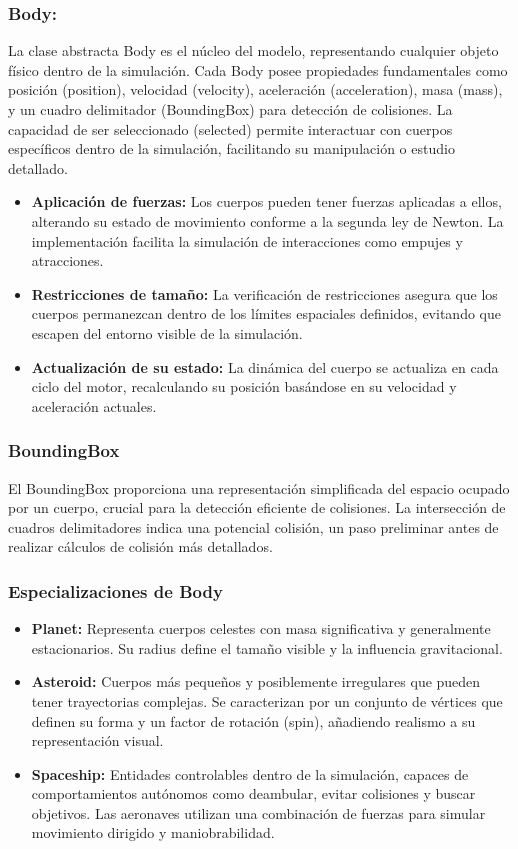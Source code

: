 \subsubsection{\textbf{Body:}}
La clase abstracta Body es el núcleo del modelo, representando cualquier objeto físico dentro de la simulación. Cada Body posee propiedades fundamentales como posición (position), velocidad (velocity), aceleración (acceleration), masa (mass), y un cuadro delimitador (BoundingBox) para detección de colisiones. La capacidad de ser seleccionado (selected) permite interactuar con cuerpos específicos dentro de la simulación, facilitando su manipulación o estudio detallado.
\begin{itemize}
    \item \textbf{Aplicación de fuerzas:} Los cuerpos pueden tener fuerzas aplicadas a ellos, alterando su estado de movimiento conforme a la segunda ley de Newton. La implementación facilita la simulación de interacciones como empujes y atracciones.
    \item \textbf{Restricciones de tamaño:} La verificación de restricciones asegura que los cuerpos permanezcan dentro de los límites espaciales definidos, evitando que escapen del entorno visible de la simulación.
    \item \textbf{Actualización de su estado:} La dinámica del cuerpo se actualiza en cada ciclo del motor, recalculando su posición basándose en su velocidad y aceleración actuales.
\end{itemize}
\subsubsection{\textbf{BoundingBox}}
El BoundingBox proporciona una representación simplificada del espacio ocupado por un cuerpo, crucial para la detección eficiente de colisiones. La intersección de cuadros delimitadores indica una potencial colisión, un paso preliminar antes de realizar cálculos de colisión más detallados.
\subsubsection{\textbf{Especializaciones de Body}}
\begin{itemize}
    \item \textbf{Planet:} Representa cuerpos celestes con masa significativa y generalmente estacionarios. Su radius define el tamaño visible y la influencia gravitacional.
    \item \textbf{Asteroid:} Cuerpos más pequeños y posiblemente irregulares que pueden tener trayectorias complejas. Se caracterizan por un conjunto de vértices que definen su forma y un factor de rotación (spin), añadiendo realismo a su representación visual.
    \item \textbf{Spaceship:} Entidades controlables dentro de la simulación, capaces de comportamientos autónomos como deambular, evitar colisiones y buscar objetivos. Las aeronaves utilizan una combinación de fuerzas para simular movimiento dirigido y maniobrabilidad.
\end{itemize}
